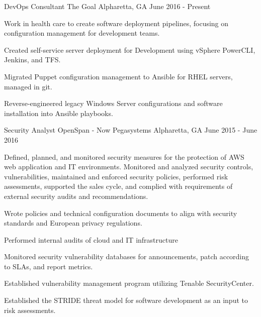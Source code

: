 


\begin{cventries}


\cventry
{DevOps Consultant}
{The Goal}
{Alpharetta, GA}
{June 2016 - Present}
{ %
Work in health care to create software deployment pipelines, focusing on configuration management for development teams.
\begin{cvitems}
\item[]
\item {Created self-service server deployment for Development using vSphere PowerCLI, Jenkins, and TFS.}
\item {Migrated Puppet configuration management to Ansible for RHEL servers, managed in git.}
\item {Reverse-engineered legacy Windows Server configurations and software installation into Ansible playbooks.}
\end{cvitems}
}


\cventry
{Security Analyst}
{OpenSpan - Now Pegasystems}
{Alpharetta, GA}
{June 2015 - June 2016}
{ %
Defined, planned, and monitored security measures for the protection of AWS web application and IT environments. Monitored and analyzed security controls, vulnerabilities, maintained and enforced security policies, performed risk assessments, supported the sales cycle, and complied with requirements of external security audits and recommendations.
\begin{cvitems}
\item[]
\item {Wrote policies and technical configuration documents to align with security standards and European privacy regulations.}
\item {Performed internal audits of cloud and IT infrastructure}
\item {Monitored security vulnerability databases for announcements, patch according to SLAs, and report metrics.}
\item {Established vulnerability management program utilizing Tenable SecurityCenter.}
\item {Established the STRIDE threat model for software development as an input to risk assessments.}
\end{cvitems}
}


\end{cventries}
